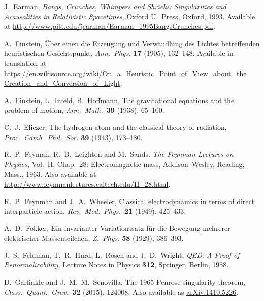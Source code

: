 \documentclass{article}
\begin{document}
\begin{thebibliography}{10}
 J.\ Earman, \textsl{Bangs, Crunches, Whimpers and Shrieks: Singularities and Acausalities in Relativistic Spacetimes}, Oxford U.\ Press, Oxford,
1993.  Available at \href{http://www.pitt.edu/~jearman/Earman_1995BangsCrunches.pdf}{http://www.pitt.edu/\~jearman/Earman\_1995BangsCrunches.pdf}.

 A.\ Einstein, \"Uber einen die Erzeugung und Verwandlung des Lichtes betreffenden heuristischen Gesichtspunkt, \textsl{Ann.\ Phys.} \textbf{17} (1905), 132--148.  Available in translation at \href{https://en.wikisource.org/wiki/On_a_Heuristic_Point_of_View_about_the_Creation_and_Conversion_of_Light}{https://en.wikisource.org/wiki/On\_a\_Heuristic\_Point\_of\_View\_about\_the}
\href{https://en.wikisource.org/wiki/On_a_Heuristic_Point_of_View_about_the_Creation_and_Conversion_of_Light}{Creation\_and\_Conversion\_of\_Light}.

 A.\ Einstein, L.\ Infeld, B.\ Hoffmann, The gravitational equations and the problem of motion, \textsl{Ann.\ Math.\ }\textbf{39} (1938), 65--100.

 C.\ J.\ Eliezer, The hydrogen atom and the classical theory of
radiation, \textsl{Proc.\ Camb.\ Phil.\ Soc.} \textbf{39} (1943), 173--180.

 R.\ P.\ Feyman, R.\ B.\ Leighton and M.\ Sands. 
\textsl{The Feynman Lectures on Physics,} Vol.\ II, Chap.\ 28: Electromagnetic mass, Addison--Wesley, Reading, Mass., 1963.  Also available at \href{http://www.feynmanlectures.caltech.edu/II_28.html}
{http://www.feynmanlectures.caltech.edu/II\_28.html}.

 R.\ P.\ Feynman and J.\ A.\ Wheeler, 
Classical electrodynamics in terms of direct interparticle action, \textsl{Rev.\ Mod.\
Phys.\ }\textbf{21} (1949), 425--433.  
 
 A.\ D.\ Fokker, Ein invarianter Variationssatz f\"ur die Bewegung mehrerer elektrischer Massenteilchen, \textsl{Z.\ Phys.} \textbf{58} (1929), 386--393.

 J.\ S.\ Feldman, T.\ R.\ Hurd, L.\ Rosen and J.\ D.\ Wright, \textsl{QED: A Proof of Renormalizability,} Lecture Notes in Physics \textbf{312}, Springer, Berlin, 1988.

 D.\ Garfinkle and J.\ M.\ M.\ Senovilla, The 1965 Penrose singularity theorem, \textsl{Class.\ Quant.\ Grav.\ }\textbf{32} (2015), 124008.  Also available as \href{http://arxiv.org/abs/1410.5226}{arXiv:1410.5226}.


\end{thebibliography}
\end{document}
